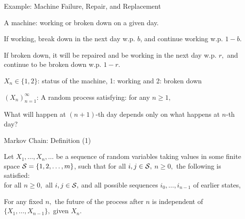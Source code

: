 \begin{frame}{Example: Machine Failure, Repair, and Replacement}

\plitemsep 0.1in
\bci 
\item A machine: working or broken down on a given day. 
\bci
\item If working, break down in the next day w.p. $b$, and continue working w.p. $1-b.$

\item If broken down, it will be repaired and be working in the next day w.p. $r,$ and continue to be broken down w.p. $1-r.$ 
\eci

\item<2-> $X_n \in \{1,2 \}$: status of the machine, 1: working and 2: broken down

\item<3-> $(X_n)_{n=1}^\infty$: A random process satisfying: for any $n \ge 1,$

\item<4-> What will happen at $(n+1)$-th day depends only on what happens at $n$-th day? 
\eci 
\end{frame}


\begin{frame}{Markov Chain: Definition (1)}



  \plitemsep 0.1in

\bci 
\item<2->  Let $X_1, \ldots, X_n, \ldots$ be a sequence of random
  variables taking values in some finite space
  $\mathcal S=\{1, 2, \ldots, m\}$, such that   for all $i,j \in
  \mathcal S,$ $n\geq 0,$ the following  is
  satisfied:\\
  for all $n \geq 0,$ all $i,j \in \mathcal S,$ and all possible
  sequences $i_0, \ldots, i_{n-1}$ of earlier states, 

\item<4->  
  For any fixed $n,$ the future of the process after $n$ is {\red independent}
  of $\{X_1, \ldots, X_{n-1} \},$ {\red given} $X_n.$


\eci 
\end{frame}



